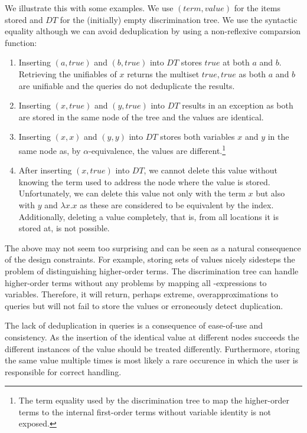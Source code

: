 We illustrate this with some examples. We use $(term, value)$ for the items stored and $DT$ for the (initially) empty discrimination tree. We use the syntactic equality although we can avoid deduplication by using a non-reflexive comparsion function:
\begin{enumerate}
  \item Inserting $(a,true)$ and $(b,true)$ into $DT$ stores $true$ at both $a$ and $b$. Retrieving the unifiables of $x$ returns the multiset ${true, true}$ as both $a$ and $b$ are unifiable and the queries do not deduplicate the results.
  \item Inserting $(x,true)$ and $(y,true)$ into $DT$ results in an exception as both are stored in the same node of the tree and the values are identical.
  \item Inserting $(x,x)$ and $(y,y)$ into $DT$ stores both variables $x$ and $y$ in the same node as, by $\alpha$-equivalence, the values are different.\footnote{The term equality used by the discrimination tree to map the higher-order terms to the internal first-order terms without variable identity is not exposed.}
  \item After inserting $(x,true)$ into $DT$, we cannot delete this value without knowing the term used to address the node where the value is stored. Unfortunately, we can delete this value not only with the term $x$ but also with $y$ and $\lambda x. x$ as these are considered to be equivalent by the index. Additionally, deleting a value completely, that is, from all locations it is stored at, is not possible.
\end{enumerate}
The above may not seem too surprising and can be seen as a natural consequence of the design constraints. For example, storing sets of values nicely sidesteps the problem of distinguishing higher-order terms. The discrimination tree can handle higher-order terms without any problems by mapping all \lam -expressions to variables. Therefore, it will return, perhaps extreme, overapproximations to queries but will not fail to store the values or erroneously detect duplication.

The lack of deduplication in queries is a consequence of ease-of-use and consistency. As the insertion of the identical value at different nodes succeeds the different instances of the value should be treated differently. Furthermore, storing the same value multiple times is most likely a rare occurence in which the user is responsible for correct handling.

